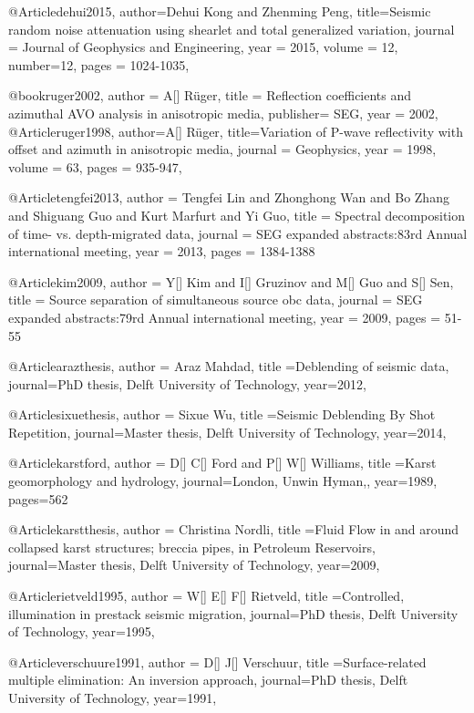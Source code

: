 @Article{dehui2015,
  author={Dehui Kong and Zhenming Peng},
  title={Seismic random noise attenuation using shearlet and total generalized variation},
  journal = 	 {Journal of Geophysics and Engineering},
  year = 	 2015,
  volume =	 12,
  number=12,
  pages =	 {1024-1035},
}

@book{ruger2002,
  author = 	 {A[] R\"{u}ger},
  title  = 	 {Reflection coefficients and azimuthal AVO analysis in anisotropic media},
  publisher= 	 {SEG},
  year   = 	 2002,
}
@Article{ruger1998,
  author={A[] R\"{u}ger},
  title={Variation of P-wave reflectivity with offset and azimuth in anisotropic media},
  journal = 	 {Geophysics},
  year = 	 1998,
  volume =	 63,
  pages =	 {935-947},
}

@Article{tengfei2013,
  author = 	 {Tengfei Lin and Zhonghong Wan and Bo Zhang and Shiguang Guo and Kurt Marfurt and Yi Guo},
  title = 	 {Spectral decomposition of time- vs. depth-migrated data},
  journal = 	 {SEG expanded abstracts:83rd Annual international meeting},
  year = 	 2013,
  pages =	 {1384-1388}
}

@Article{kim2009,
  author = 	 {Y[] Kim and I[] Gruzinov and M[] Guo and S[] Sen},
  title = 	 {Source separation of simultaneous source obc data},
  journal = 	 {SEG expanded abstracts:79rd Annual international meeting},
  year = 	 2009,
  pages =	 {51-55}
}

@Article{arazthesis,
  author = {Araz Mahdad},
  title ={Deblending of seismic data},
  journal={PhD thesis, Delft University of Technology},
  year=2012,
}

@Article{sixuethesis,
  author = {Sixue Wu},
  title ={Seismic Deblending By Shot Repetition},
  journal={Master thesis, Delft University of Technology},
  year=2014,
}

@Article{karstford,
  author = {D[] C[] Ford and P[] W[] Williams},
  title ={Karst geomorphology and hydrology},
  journal={London, Unwin Hyman,},
  year=1989,
  pages={562}
}

@Article{karstthesis,
  author = {Christina Nordli},
  title ={Fluid Flow in and around collapsed karst structures; breccia pipes, in
Petroleum Reservoirs},
  journal={Master thesis, Delft University of Technology},
  year=2009,
}


@Article{rietveld1995,
  author = {W[] E[] F[] Rietveld},
  title ={Controlled, illumination in prestack seismic migration},
  journal={PhD thesis, Delft University of Technology},
  year=1995,
}

@Article{verschuure1991,
  author = {D[] J[] Verschuur},
  title ={Surface-related multiple elimination: An inversion approach},
  journal={PhD thesis, Delft University of Technology},
  year=1991,
}


